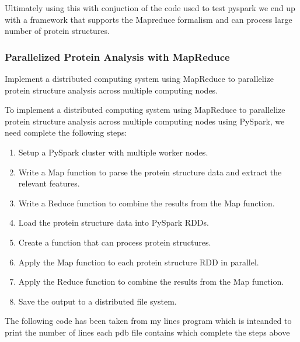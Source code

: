 \documentclass[]{final_report}
\begin{document}
Ultimately using this with conjuction of the code used to test pyspark we end up with a framework that supports the Mapreduce formalism and can process large number of protein structures.

\clearpage

\subsubsection{Parallelized Protein Analysis with MapReduce}

\begin{displayquote}
    Implement a distributed computing system using MapReduce to parallelize protein structure analysis across multiple computing nodes.
\end{displayquote}

To implement a distributed computing system using MapReduce to parallelize protein structure analysis across multiple computing nodes using PySpark, we need complete the following steps:

\begin{enumerate}
    \item Setup a PySpark cluster with multiple worker nodes.
    \item Write a Map function to parse the protein structure data and extract the relevant features.
    \item Write a Reduce function to combine the results from the Map function.
    \item Load the protein structure data into PySpark RDDs.
    \item Create a function that can process protein structures.
    \item Apply the Map function to each protein structure RDD in parallel.
    \item Apply the Reduce function to combine the results from the Map function.
    \item Save the output to a distributed file system.
\end{enumerate}

The following code has been taken from my lines program which is inteanded to print the number of lines each pdb file contains which complete the steps above
\end{document}
